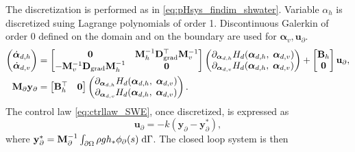 The discretization is performed as in \eqref{eq:pHsys_findim_shwater}. Variable $\alpha_h$ is discretized suing Lagrange polynomials of order 1. Discontinuous Galerkin of order 0 defined on the domain and on the boundary are used for $\bm{\alpha}_v, \bm{u}_\partial$.
\begin{equation}\label{eq:pHsys_findim_shwater_ctrl}
\begin{aligned}
\begin{pmatrix}
\dot{\bm{\alpha}}_{d, h} \\
\dot{\bm{\alpha}}_{d, v} \\
\end{pmatrix}
&= \begin{bmatrix}
\mathbf{0} &  \mathbf{M}_h^{-1} \mathbf{D}_{\operatorname*{grad}}^\top \mathbf{M}_v^{-1} \\
-\mathbf{M}_v^{-1} \mathbf{D}_{\operatorname*{grad}} \mathbf{M}_h^{-1} & \mathbf{0} \\
\end{bmatrix} 
\begin{pmatrix}
\partial_{\bm{\alpha}_{d, h}} H_d(\bm{\alpha}_{d, h},\; \bm{\alpha}_{d, v})\\
\partial_{\bm{\alpha}_{d, v}} H_d(\bm{\alpha}_{d, h},\; \bm{\alpha}_{d, v})\\
\end{pmatrix} + 
\begin{bmatrix}
\mathbf{B}_h \\
\mathbf{0}\\
\end{bmatrix}
\mathbf{u}_\partial, \\
\mathbf{M}_\partial {\mathbf{y}_\partial} &= \begin{bmatrix}
\mathbf{B}_h^\top & \mathbf{0}
\end{bmatrix}\begin{pmatrix}
\partial_{\bm{\alpha}_{d, h}} H_d(\bm{\alpha}_{d, h},\; \bm{\alpha}_{d, v})\\
\partial_{\bm{\alpha}_{d, v}} H_d(\bm{\alpha}_{d, h},\; \bm{\alpha}_{d, v})\\
\end{pmatrix}.
\end{aligned}
\end{equation}
The control law \eqref{eq:ctrllaw_SWE}, once discretized, is expressed as
\begin{equation}
	\mathbf{u}_\partial = -k (\mathbf{y}_\partial - \mathbf{y}_\partial^*),
\end{equation}
where $\mathbf{y}_\partial^* = \mathbf{M}_\partial^{-1}\int_{\partial\Omega} \rho g h_* \phi_\partial(s) \d\Gamma$. The closed loop system is then
